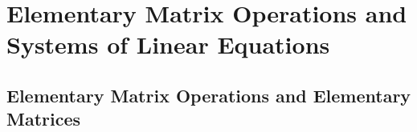 \chapter{Elementary Matrix Operations and Systems of Linear Equations}
\thispagestyle{empty}
\newpage

\section{Elementary Matrix Operations and Elementary Matrices}



\vspace{12pt}

\setcounter{Exercise}{11}

